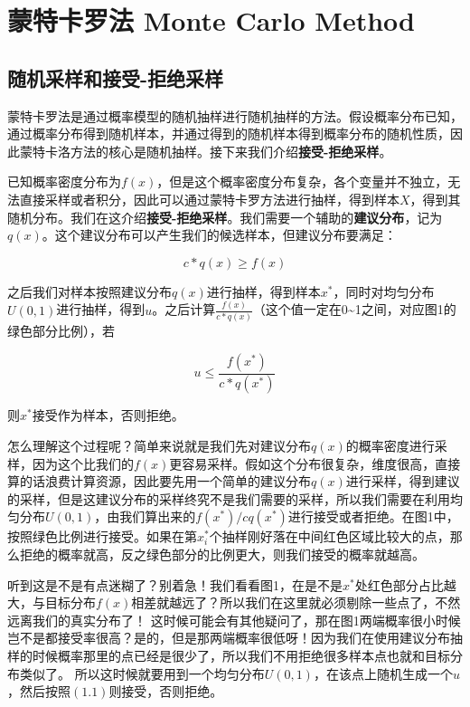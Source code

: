 \section{蒙特卡罗法 Monte Carlo Method}

\subsection{随机采样和接受-拒绝采样}

蒙特卡罗法是通过概率模型的随机抽样进行随机抽样的方法。假设概率分布已知，通过概率分布得到随机样本，并通过得到的随机样本得到概率分布的随机性质，因此蒙特卡洛方法的核心是随机抽样。接下来我们介绍\textbf{接受-拒绝采样}。

已知概率密度分布为\(f(x)\)，但是这个概率密度分布复杂，各个变量并不独立，无法直接采样或者积分，因此可以通过蒙特卡罗方法进行抽样，得到样本\emph{\(X\)}，得到其随机分布。我们在这介绍\textbf{接受-拒绝采样}。我们需要一个辅助的\textbf{建议分布}，记为\(q(x)\)。这个建议分布可以产生我们的候选样本，但建议分布要满足：

\[c * q(x) \geq f(x)\]

之后我们对样本按照建议分布\(q(x)\)进行抽样，得到样本\(x^*\)，同时对均匀分布\(U(0,1)\)进行抽样，得到\(u\)。之后计算\(\frac{f(x)}{c*q(x)}\)（这个值一定在0\textasciitilde1之间，对应图1的绿色部分比例），若

\[u \leq \frac{f(x^*)}{c*q(x^*)} \tag{1.1}\]

则\(x^*\)接受作为样本，否则拒绝。

怎么理解这个过程呢？简单来说就是我们先对建议分布\(q(x)\)的概率密度进行采样，因为这个比我们的\(f(x)\)更容易采样。假如这个分布很复杂，维度很高，直接算的话浪费计算资源，因此要先用一个简单的建议分布\(q(x)\)进行采样，得到建议的采样，但是这建议分布的采样终究不是我们需要的采样，所以我们需要在利用均匀分布\(U(0,1)\)，由我们算出来的\(f(x^*)/cq(x^*)\)进行接受或者拒绝。在图1中，按照绿色比例进行接受。如果在第\(x^*_i\)个抽样刚好落在中间红色区域比较大的点，那么拒绝的概率就高，反之绿色部分的比例更大，则我们接受的概率就越高。

\begin{figure}
\centering
\caption{}
\end{figure}

听到这是不是有点迷糊了？别着急！我们看看图1，在是不是\(x^*\)处红色部分占比越大，与目标分布\(f(x)\)相差就越远了？所以我们在这里就必须剔除一些点了，不然远离我们的真实分布了！
这时候可能会有其他疑问了，那在图1两端概率很小时候岂不是都接受率很高？是的，但是那两端概率很低呀！因为我们在使用建议分布抽样的时候概率那里的点已经是很少了，所以我们不用拒绝很多样本点也就和目标分布类似了。
所以这时候就要用到一个均匀分布\(U(0,1)\)，在该点上随机生成一个\(u\)，然后按照\((1.1)\)则接受，否则拒绝。

